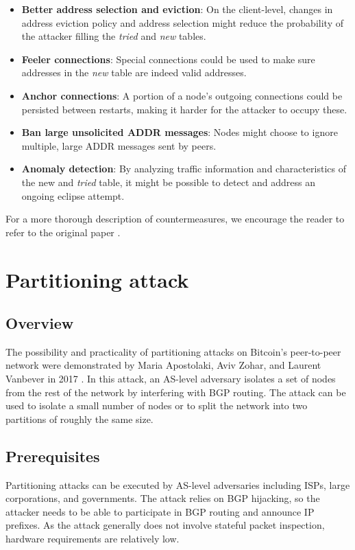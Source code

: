 \documentclass[12pt]{article}
\begin{document}
\begin{itemize}
    \item \textbf{Better address selection and eviction}: On the client-level, changes in address eviction policy and address selection might reduce the probability of the attacker filling the \emph{tried} and \emph{new} tables.
    \item \textbf{Feeler connections}: Special connections could be used to make sure addresses in the \emph{new} table are indeed valid addresses.
    \item \textbf{Anchor connections}: A portion of a node's outgoing connections could be persisted between restarts, making it harder for the attacker to occupy these.
    \item \textbf{Ban large unsolicited ADDR messages}: Nodes might choose to ignore multiple, large ADDR messages sent by peers.
    \item \textbf{Anomaly detection}: By analyzing traffic information and characteristics of the new and \emph{tried} table, it might be possible to detect and address an ongoing eclipse attempt.
\end{itemize}

For a more thorough description of countermeasures, we encourage the reader to refer to the original paper \cite{Heilman2015EclipseAO}.

\section{Partitioning attack}
\label{sec:partitioning}

\subsection{Overview}

The possibility and practicality of partitioning attacks on Bitcoin's peer-to-peer network were demonstrated by Maria Apostolaki, Aviv Zohar, and Laurent Vanbever in 2017 \cite{RoutingAttacks}. In this attack, an AS-level adversary isolates a set of nodes from the rest of the network by interfering with BGP routing. The attack can be used to isolate a small number of nodes or to split the network into two partitions of roughly the same size.

\subsection{Prerequisites}

Partitioning attacks can be executed by AS-level adversaries including ISPs, large corporations, and governments. The attack relies on BGP hijacking, so the attacker needs to be able to participate in BGP routing and announce IP prefixes. As the attack generally does not involve stateful packet inspection, hardware requirements are relatively low.
\end{document}
